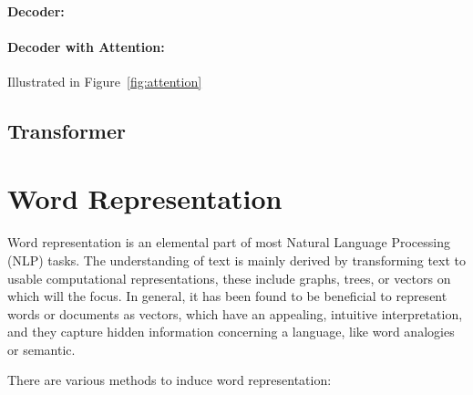 \paragraph{Decoder:}

\paragraph{Decoder with Attention:}

Illustrated in Figure~\ref{fig:attention}

\subsection{Transformer}

\section{Word Representation}
\label{sec:word_embedding}
\paragraph{}
Word representation is an elemental part of most Natural Language Processing (NLP) tasks. The understanding of text is mainly derived by transforming text to usable computational representations, these include graphs, trees, or vectors on which will the focus.   In general, it has been found to be beneficial to represent words or documents as vectors, which have an appealing, intuitive interpretation, and they capture hidden information concerning a language, like word analogies or semantic. 


There are various methods to induce word representation:

